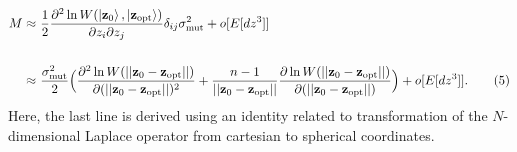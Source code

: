 \documentclass[11pt]{article}
\begin{document}
    \begin{align*}
        M \approx& \ \frac{1}{2} \frac{\partial^2 \ln W(\ket{\mathbf{z}_0}, \ket{\mathbf{z}_{\mathrm{opt}}})}{ \partial z_i \partial z_j} \delta_{ij}\sigma_{\mathrm{mut}}^2 + o[E[dz^3]] \\
        \\  \approx& \ \frac{ \sigma_{\mathrm{mut}}^2}{2}   \Big( \frac{\partial^2 \ln W(||\mathbf{z}_0 - \mathbf{z}_{\mathrm{opt}} ||)}{\partial(||\mathbf{z}_0 - \mathbf{z}_{\mathrm{opt}} ||)^2} + \frac{n-1}{||\mathbf{z}_0 - \mathbf{z}_{\mathrm{opt}} ||} \frac{\partial \ln W(||\mathbf{z}_0 - \mathbf{z}_{\mathrm{opt}} ||)}{\partial(||\mathbf{z}_0 - \mathbf{z}_{\mathrm{opt}} ||)}   \Big) + o[E[dz^3]].  \tag{5}
    \end{align*}
Here, the last line is derived using an identity related to transformation of the $N$-dimensional Laplace operator from cartesian to spherical coordinates.
\end{document}
